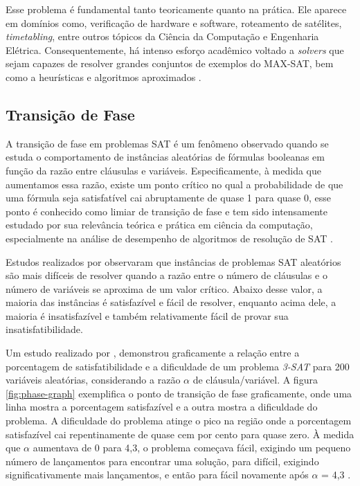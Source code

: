 Esse problema é fundamental tanto teoricamente quanto na prática. Ele aparece em domínios como, verificação de hardware e software, roteamento de satélites, \textit{timetabling}, entre outros tópicos da Ciência da Computação e Engenharia Elétrica. Consequentemente, há intenso esforço acadêmico voltado a \textit{solvers} que sejam capazes de resolver grandes conjuntos de exemplos do MAX-SAT, bem como a heurísticas e algoritmos aproximados \cite{biere2009handbook}. 

\subsection{Transição de Fase}

A transição de fase em problemas SAT é um fenômeno observado quando se estuda o comportamento de instâncias aleatórias de fórmulas booleanas em função da razão entre cláusulas e variáveis. Especificamente, à medida que aumentamos essa razão, existe um ponto crítico no qual a probabilidade de que uma fórmula seja satisfatível cai abruptamente de quase 1 para quase 0, esse ponto é conhecido como limiar de transição de fase e tem sido intensamente estudado por sua relevância teórica e prática em ciência da computação, especialmente na análise de desempenho de algoritmos de resolução de SAT \cite{cheeseman1991really}. 

Estudos realizados por  observaram que instâncias de problemas SAT aleatórios são mais difíceis de resolver quando a razão entre o número de cláusulas e o número de variáveis se aproxima de um valor crítico. Abaixo desse valor, a maioria das instâncias é satisfazível e fácil de resolver, enquanto acima dele, a maioria é insatisfazível e também relativamente fácil de provar sua insatisfatibilidade.

Um estudo realizado por , demonstrou graficamente a relação entre a porcentagem de satisfatibilidade e a dificuldade de um problema \textit{3-SAT} para 200 variáveis aleatórias, considerando a razão $\alpha$ de cláusula/variável. A figura \ref{fig:phase-graph} exemplifica o ponto de transição de fase graficamente, onde uma linha mostra a porcentagem satisfazível e a outra mostra a dificuldade do problema. A dificuldade do problema atinge o pico na região onde a porcentagem satisfazível cai repentinamente de quase cem por cento para quase zero. À medida que $\alpha$ aumentava de 0 para 4,3, o problema começava fácil, exigindo um pequeno número de lançamentos para encontrar uma solução, para difícil, exigindo significativamente mais lançamentos, e então para fácil novamente após $\alpha$ = 4,3 \cite{qasem2009sat}.

